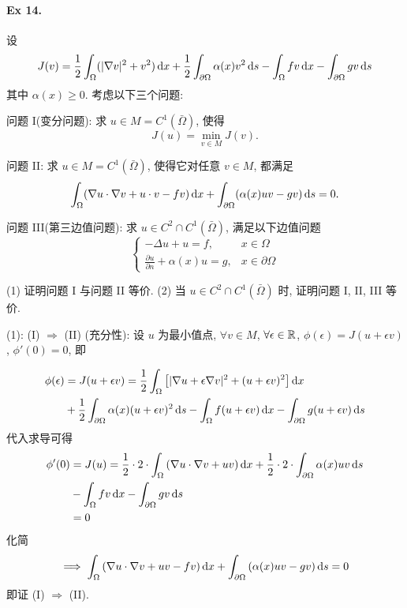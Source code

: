 \paragraph{Ex 14.}
设
\[
J(v) = \frac{1}{2} \int_{\Omega} (|\nabla v|^2 + v^2)\operatorname{d\!} x
+ \frac{1}{2} \int_{\partial \Omega} \alpha(x) v^2 \operatorname{d\!} s
- \int_{\Omega} fv \operatorname{d\!} x - \int_{\partial \Omega} gv \operatorname{d\!} s
\]
其中 $\alpha(x) \geq 0$. 考虑以下三个问题:

问题 I(变分问题): 求 $u \in M = C^1(\bar \Omega)$, 使得
\[
J(u)= \min_{v \in M} J(v).
\]

问题 II: 求 $u \in M = C^1(\bar \Omega)$, 使得它对任意 $v \in M$, 都满足
\[
\int_{\Omega} (\nabla u \cdot \nabla v + u \cdot v - fv)\operatorname{d\!} x
+ \int_{\partial \Omega} (\alpha(x) uv-gv )\operatorname{d\!} s = 0.
\]

问题 III(第三边值问题): 求 $u \in C^2 \cap C^1(\bar \Omega)$, 满足以下边值问题
\[ \begin{cases}
- \Delta u + u = f, & x \in \Omega \\
\frac{\partial u}{\partial n} + \alpha (x) u = g, & x \in \partial \Omega
\end{cases} \]

(1) 证明问题 I 与问题 II 等价.
(2) 当 $u \in C^2 \cap C^1(\bar \Omega)$ 时, 证明问题 I, II, III 等价.

\solproof (1): (I) $\Rightarrow$ (II) (充分性):
设 $u$ 为最小值点, $\forall v \in M$, $\forall \epsilon \in {\mathbb R}$,
$\phi(\epsilon) = J(u + \epsilon v)$, $\phi'(0) = 0$, 即

\[ \begin{aligned}
\phi(\epsilon) &= J(u + \epsilon v) = \frac12 \int_\Omega 
  \left[ |\nabla u + \epsilon \nabla v|^2 + (u + \epsilon v)^2 \right]
  \operatorname{d\!} x \\
&+ \frac12 \int_{\partial\Omega} \alpha(x) (u + \epsilon v)^2 \operatorname{d\!} s
  - \int_\Omega f(u + \epsilon v) \operatorname{d\!} x
  - \int_{\partial\Omega} g(u + \epsilon v) \operatorname{d\!} s
\end{aligned} \]
代入求导可得
\[ \begin{aligned}
\phi'(0) &= J(u) = \frac12\cdot 2\cdot \int_\Omega
    \left( \nabla u \cdot \nabla v + uv \right) \operatorname{d\!} x
  + \frac12\cdot 2\cdot \int_{\partial\Omega} \alpha(x)uv \operatorname{d\!} s \\
&- \int_\Omega fv\operatorname{d\!} x - \int_{\partial\Omega} gv\operatorname{d\!} s \\
&= 0
\end{aligned} \]
化简
\[ \implies
\int_\Omega \left( \nabla u \cdot \nabla v + uv -fv \right) \operatorname{d\!} x
+ \int_{\partial\Omega} \left( \alpha(x)uv - gv \right) \operatorname{d\!} s = 0
\]
即证 (I) $\Rightarrow$ (II).

